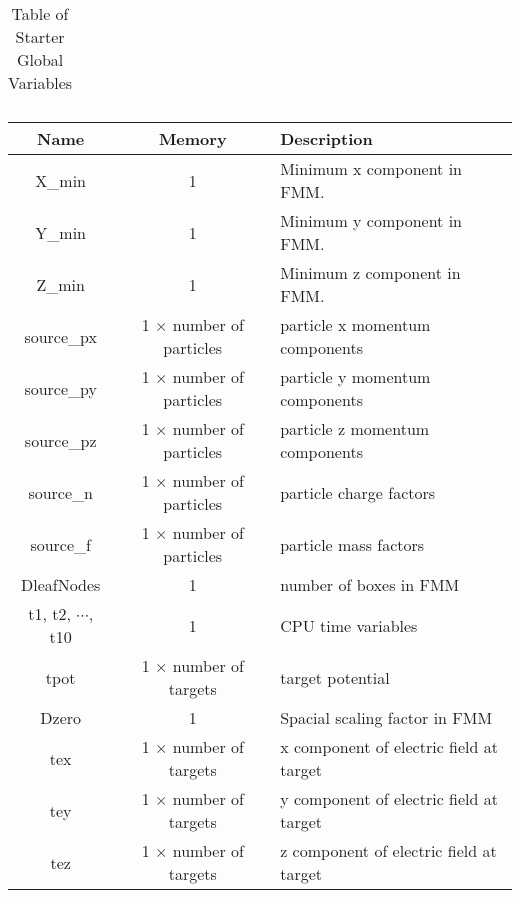 \documentclass[oneside,12pt]{book}
\begin{document}
\begin{center}
\begin{table}[ht]
\begin{tabular}{|c|c|p{2.7in}|}
\hline
\end{tabular}
\caption{Table of Starter Global Variables}
\end{table}
\end{center}

\begin{center}
\begin{table}[ht]
\begin{tabular}{|c|c|p{2.7in}|}
\hline
\textbf{Name} & \textbf{Memory} & \textbf{Description}\\
\hline
X\_min & 1 & Minimum x component in FMM.\\
\hline
Y\_min & 1 & Minimum y component in FMM.\\
\hline
Z\_min & 1 & Minimum z component in FMM.\\
\hline
source\_px & 1 $\times$ number of particles & particle x momentum components\\
\hline
source\_py & 1 $\times$ number of particles & particle y momentum components\\
\hline
source\_pz & 1 $\times$ number of particles & particle z momentum components\\
\hline
source\_n & 1 $\times$ number of particles & particle charge factors\\
\hline
source\_f & 1 $\times$ number of particles & particle mass factors\\
\hline
DleafNodes & 1 & number of boxes in FMM\\
\hline
t1, t2, $\cdots$, t10 & 1 & CPU time variables\\
\hline
tpot & 1 $\times$ number of targets & target potential\\
\hline
Dzero & 1 & Spacial scaling factor in FMM\\
\hline
tex & 1 $\times$ number of targets & x component of electric field at target\\
\hline
tey & 1 $\times$ number of targets & y component of electric field at target\\
\hline
tez & 1 $\times$ number of targets & z component of electric field at target\\

\end{tabular}
\end{table}
\end{center}
\end{document}
